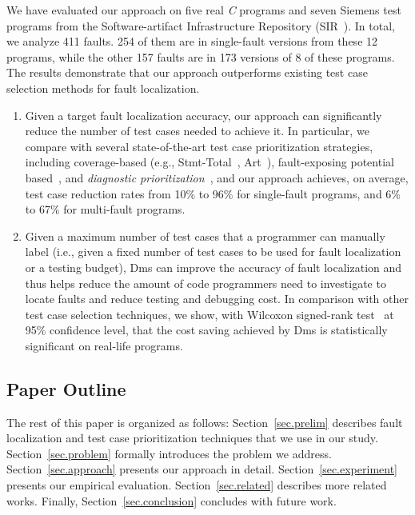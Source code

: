We have evaluated our approach on five real {\em C} programs and seven Siemens test programs from the Software-artifact Infrastructure Repository (SIR~\citep{doESE05}).
In total, we analyze 411 faults. 254 of them are in single-fault versions from these 12 programs, while the other 157 faults are in 173 versions of 8 of these programs.
The results demonstrate that our approach
outperforms existing test case selection methods for fault localization.

\begin{enumerate}
	\setlength{\parskip}{0pt}%
    \setlength{\itemsep}{3pt}%
	\item Given a target fault localization accuracy, our approach can significantly reduce the number of test cases needed to achieve it. In particular, we compare with several state-of-the-art test case prioritization strategies, including coverage-based (e.g., {\sc Stmt-Total}~\citep{RUCH01,SEAGMGR01}, {\sc Art}~\citep{JiangZCT09}), fault-exposing potential based~\citep{RUCH01}, and {\em diagnostic prioritization}~\citep{Alberto2011,Gonzalez-SanchezPAGG11,JiangCT11}, and our approach achieves, on average, test case reduction rates from
10\% to 96\% for single-fault programs, and 6\% to 67\% for multi-fault programs.
	\item Given a maximum number of test cases that a programmer can manually label (i.e., given a fixed number of test cases to be used for fault localization or a testing budget), {\sc Dms} can improve the accuracy of fault localization and thus helps reduce the amount of code programmers need to investigate to locate faults and reduce testing and debugging cost. In comparison with other test case selection techniques, we show, with Wilcoxon signed-rank test~\citep{WF1943} at 95\% confidence level, that the cost saving achieved by {\sc Dms} is statistically significant on real-life programs.
\end{enumerate}

\subsection{Paper Outline}

The rest of this paper is organized as follows: Section~\ref{sec.prelim} describes fault localization and test case prioritization techniques that we use in our study. Section~\ref{sec.problem} formally introduces the problem we address. Section~\ref{sec.approach} presents our approach in detail. Section~\ref{sec.experiment} presents our empirical evaluation. Section~\ref{sec.related} describes more related works.
Finally, Section~\ref{sec.conclusion} concludes with future work.
